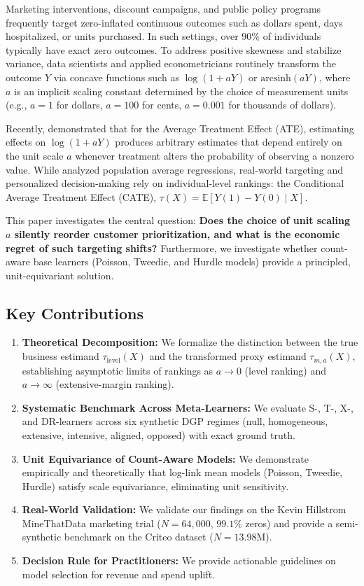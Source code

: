 \documentclass[11pt,a4paper]{article}
\newcommand{\taulevel}{\tau_{\text{level}}}
\newcommand{\tauma}{\tau_{m, a}}
\newcommand{\E}{\mathbb{E}}
\begin{document}
Marketing interventions, discount campaigns, and public policy programs frequently target zero-inflated continuous outcomes such as dollars spent, days hospitalized, or units purchased. In such settings, over $90\%$ of individuals typically have exact zero outcomes. To address positive skewness and stabilize variance, data scientists and applied econometricians routinely transform the outcome $Y$ via concave functions such as $\log(1 + aY)$ or $\text{arcsinh}(aY)$, where $a$ is an implicit scaling constant determined by the choice of measurement units (e.g., $a=1$ for dollars, $a=100$ for cents, $a=0.001$ for thousands of dollars).

Recently, \cite{chen2024logs} demonstrated that for the Average Treatment Effect (ATE), estimating effects on $\log(1 + aY)$ produces arbitrary estimates that depend entirely on the unit scale $a$ whenever treatment alters the probability of observing a nonzero value. While \cite{chen2024logs} analyzed population average regressions, real-world targeting and personalized decision-making rely on individual-level rankings: the Conditional Average Treatment Effect (CATE), $\tau(X) = \E[Y(1) - Y(0) \mid X]$.

This paper investigates the central question: \textbf{Does the choice of unit scaling $a$ silently reorder customer prioritization, and what is the economic regret of such targeting shifts?} Furthermore, we investigate whether count-aware base learners (Poisson, Tweedie, and Hurdle models) provide a principled, unit-equivariant solution.

\subsection{Key Contributions}
\begin{enumerate}
    \item \textbf{Theoretical Decomposition:} We formalize the distinction between the true business estimand $\taulevel(X)$ and the transformed proxy estimand $\tauma(X)$, establishing asymptotic limits of rankings as $a \to 0$ (level ranking) and $a \to \infty$ (extensive-margin ranking).
    \item \textbf{Systematic Benchmark Across Meta-Learners:} We evaluate S-, T-, X-, and DR-learners across six synthetic DGP regimes (null, homogeneous, extensive, intensive, aligned, opposed) with exact ground truth.
    \item \textbf{Unit Equivariance of Count-Aware Models:} We demonstrate empirically and theoretically that log-link mean models (Poisson, Tweedie, Hurdle) satisfy scale equivariance, eliminating unit sensitivity.
    \item \textbf{Real-World Validation:} We validate our findings on the Kevin Hillstrom MineThatData marketing trial ($N=64{,}000$, $99.1\%$ zeros) and provide a semi-synthetic benchmark on the Criteo dataset ($N=13.98\text{M}$).
    \item \textbf{Decision Rule for Practitioners:} We provide actionable guidelines on model selection for revenue and spend uplift.
\end{enumerate}
\end{document}
